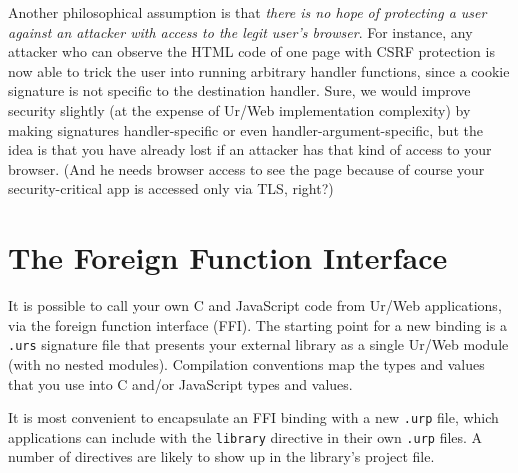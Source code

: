 \documentclass{article}
\begin{document}
Another philosophical assumption is that \emph{there is no hope of protecting a user against an attacker with access to the legit user's browser}.  For instance, any attacker who can observe the HTML code of one page with CSRF protection is now able to trick the user into running arbitrary handler functions, since a cookie signature is not specific to the destination handler.  Sure, we would improve security slightly (at the expense of Ur/Web implementation complexity) by making signatures handler-specific or even handler-argument-specific, but the idea is that you have already lost if an attacker has that kind of access to your browser.  (And he needs browser access to see the page because of course your security-critical app is accessed only via TLS, right?)


\section{\label{ffi}The Foreign Function Interface}

It is possible to call your own C and JavaScript code from Ur/Web applications, via the foreign function interface (FFI).  The starting point for a new binding is a \texttt{.urs} signature file that presents your external library as a single Ur/Web module (with no nested modules).  Compilation conventions map the types and values that you use into C and/or JavaScript types and values.

It is most convenient to encapsulate an FFI binding with a new \texttt{.urp} file, which applications can include with the \texttt{library} directive in their own \texttt{.urp} files.  A number of directives are likely to show up in the library's project file.
\end{document}
